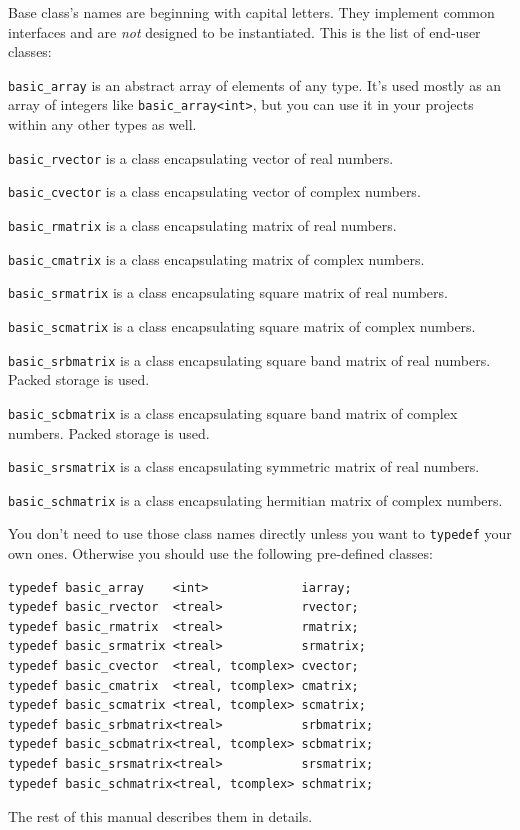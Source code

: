 \documentclass[12pt,letterpaper]{article}
\begin{document}
Base class's names are beginning with capital letters. They
implement common interfaces and are \emph{not} designed to be instantiated.
This is the list of end-user classes:
\begin{compactitem}
\item \verb"basic_array" is an abstract array of elements of any type.
It's used
mostly as an array of integers like \verb"basic_array<int>", but you
can use it in your projects within any other types as well.
\item \verb"basic_rvector" is a class encapsulating vector
of real numbers.
\item \verb"basic_cvector" is a class encapsulating vector
of complex numbers.
\item \verb"basic_rmatrix" is a class encapsulating matrix
of real numbers.
\item \verb"basic_cmatrix" is a class encapsulating matrix
of complex numbers.
\item \verb"basic_srmatrix" is a class encapsulating 
square matrix of real numbers.
\item \verb"basic_scmatrix" is a class encapsulating 
square matrix of complex numbers.
\item \verb"basic_srbmatrix" is a class encapsulating 
square band matrix of real numbers. Packed storage is
used.
\item \verb"basic_scbmatrix" is a class encapsulating 
square band matrix of complex numbers. Packed storage
is used.
\item \verb"basic_srsmatrix" is a class encapsulating 
symmetric matrix of real numbers.
\item \verb"basic_schmatrix" is a class encapsulating 
hermitian matrix of complex numbers.
\end{compactitem}

You don't need to use those class names directly unless you
want to \verb"typedef"
your own ones. Otherwise you should use the following
pre-defined classes:
\begin{Verbatim}
typedef basic_array    <int>             iarray;
typedef basic_rvector  <treal>           rvector;
typedef basic_rmatrix  <treal>           rmatrix;
typedef basic_srmatrix <treal>           srmatrix;
typedef basic_cvector  <treal, tcomplex> cvector;
typedef basic_cmatrix  <treal, tcomplex> cmatrix;
typedef basic_scmatrix <treal, tcomplex> scmatrix;
typedef basic_srbmatrix<treal>           srbmatrix;
typedef basic_scbmatrix<treal, tcomplex> scbmatrix;
typedef basic_srsmatrix<treal>           srsmatrix;
typedef basic_schmatrix<treal, tcomplex> schmatrix;
\end{Verbatim}
The rest of this manual describes them in details.
\end{document}
